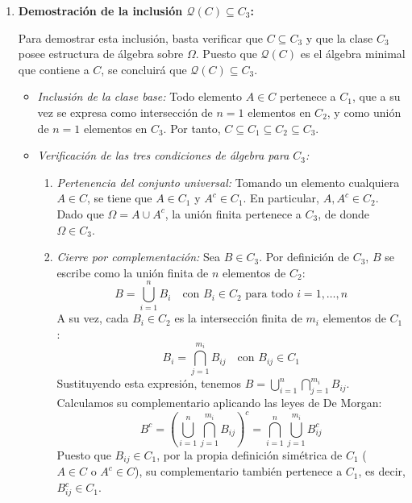 \begin{problema}
\begin{enumerate}
    \item \textbf{Demostración de la inclusión $\mathcal{Q}(C) \subseteq C_3$:}

    Para demostrar esta inclusión, basta verificar que $C \subseteq C_3$ y que la clase $C_3$ posee estructura de álgebra sobre $\Omega$. Puesto que $\mathcal{Q}(C)$ es el álgebra minimal que contiene a $C$, se concluirá que $\mathcal{Q}(C) \subseteq C_3$.

    \begin{itemize}
        \item \textit{Inclusión de la clase base:} Todo elemento $A \in C$ pertenece a $C_1$, que a su vez se expresa como intersección de $n=1$ elementos en $C_2$, y como unión de $n=1$ elementos en $C_3$. Por tanto, $C \subseteq C_1 \subseteq C_2 \subseteq C_3$.
        
        \item \textit{Verificación de las tres condiciones de álgebra para $C_3$:}
        \begin{enumerate}[label=\arabic*)]
            \item \textit{Pertenencia del conjunto universal:} Tomando un elemento cualquiera $A \in C$, se tiene que $A \in C_1$ y $A^c \in C_1$. En particular, $A, A^c \in C_2$. Dado que $\Omega = A \cup A^c$, la unión finita pertenece a $C_3$, de donde $\Omega \in C_3$.

            \item \textit{Cierre por complementación:} Sea $B \in C_3$. Por definición de $C_3$, $B$ se escribe como la unión finita de $n$ elementos de $C_2$:
            \[
                B = \bigcup_{i=1}^n B_i \quad \text{con } B_i \in C_2 \text{ para todo } i = 1, \dots, n
            \]
            A su vez, cada $B_i \in C_2$ es la intersección finita de $m_i$ elementos de $C_1$:
            \[
                B_i = \bigcap_{j=1}^{m_i} B_{ij} \quad \text{con } B_{ij} \in C_1
            \]
            Sustituyendo esta expresión, tenemos $B = \bigcup_{i=1}^n \bigcap_{j=1}^{m_i} B_{ij}$. Calculamos su complementario aplicando las leyes de De Morgan:
            \[
                B^c = \left( \bigcup_{i=1}^n \bigcap_{j=1}^{m_i} B_{ij} \right)^c = \bigcap_{i=1}^n \bigcup_{j=1}^{m_i} B_{ij}^c
            \]
            Puesto que $B_{ij} \in C_1$, por la propia definición simétrica de $C_1$ ($A \in C \text{ o } A^c \in C$), su complementario también pertenece a $C_1$, es decir, $B_{ij}^c \in C_1$.
            

\end{enumerate}
\end{itemize}
\end{enumerate}
\end{problema}
